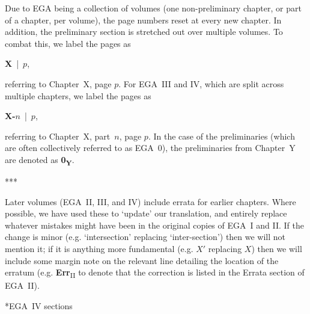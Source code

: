 \documentclass[openany,oneside]{amsbook}
\makeatletter
\theoremstyle{ega-env-style}
\theoremstyle{ega-thm-env-style}
\theoremstyle{ega-defn-env-style}
\def\section{\@startsection{section}{1}%
  \z@{.7\linespacing\@plus\linespacing}{.5\linespacing}%
  {\normalfont\bfseries\Large\scshape\centering}}
\def\sectionbreak{\begin{center}***\end{center}}
\makeatother
\begin{document}
Due to EGA being a collection of volumes (one non-preliminary chapter, or part of a chapter, per volume), the page numbers reset at every new chapter.
In addition, the preliminary section is stretched out over multiple volumes.
To combat this, we label the pages as
\begin{center}
  \textbf{X}~|~$p$,
\end{center}
referring to Chapter~X, page $p$.
For EGA~III and IV, which are split across multiple chapters, we label the pages as
\begin{center}
  \textbf{X-$n$}~|~$p$,
\end{center}
referring to Chapter~X, part~$n$, page $p$.
In the case of the preliminaries (which are often collectively referred to as EGA~0), the preliminaries from Chapter~Y are denoted as \textbf{0\textsubscript{Y}}.

\sectionbreak

Later volumes (EGA~II, III, and IV) include errata for earlier chapters.
Where possible, we have used these to `update' our translation, and entirely replace whatever mistakes might have been in the original copies of EGA~I and II.
If the change is minor (e.g. `intersection' replacing `inter-section') then we will not mention it; if it is anything more fundamental (e.g. $X'$ replacing $X$) then we will include some margin note on the relevant line detailing the location of the erratum (e.g. \textbf{Err}\textsubscript{II} to denote that the correction is listed in the Errata section of EGA~II).

\section*{EGA~IV sections}
\label{section:what-ega4-sections}
\end{document}
